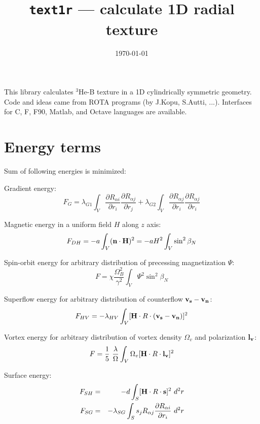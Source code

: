 \documentclass[a4paper]{article}
\begin{document}
\title{{\tt text1r} --- calculate 1D radial texture}
\date{\today}
\author{}
\maketitle

\def\sp{\sqrt{5}}
\def\st{\sqrt{3}}
\def\ddd#1#2{\frac{\partial #1}{\partial #2}}

This library calculates $^3$He-B texture in a 1D cylindrically
symmetric geometry. Code and ideas came from ROTA programs (by J.Kopu,
S.Autti, ...). Interfaces for C, F, F90, Matlab, and Octave languages
are available.

\section*{Energy terms}

Sum of following energies is minimized:

\def\bn{{\bf n}}
\def\bH{{\bf H}}
\def\divn{(\nabla\cdot\bn)}
\def\rotn{(\nabla\times\bn)}
\def\grn{\nabla\bn}

Gradient energy:
$$
F_{G}  = \lambda_{G1}\int_V
  \frac{\partial R_{\alpha i}}{\partial r_i}
  \frac{\partial R_{\alpha j}}{\partial r_j}
       + \lambda_{G2}\int_V
  \frac{\partial R_{\alpha j}}{\partial r_i}
  \frac{\partial R_{\alpha j}}{\partial r_i}
$$

Magnetic energy in a uniform field $H$ along $z$ axis:
$$
F_{DH} = - a \int_V (\bn\cdot\bH)^2 = -a H^2 \int_V \sin^2\beta_N
$$

Spin-orbit energy for arbitrary distribution of precessing magnetization $\Psi$:
$$
F = \chi \frac{\Omega^2_B}{\gamma^2} \int_V  \Psi^2 \sin^2\beta_N
$$

Superflow energy for arbitrary distribution of counterflow ${\bf v_s-v_n}$:
$$
F_{HV} = - \lambda_{HV} \int_V [\bH \cdot R \cdot ({\bf v_s-v_n})]^2
$$

Vortex energy for arbitrary distribution of vortex density $\Omega_v$
and polarization ${\bf l_v}$:
$$
F = \frac15\ \frac{\lambda}{\Omega} \int_V  \Omega_v [\bH \cdot R \cdot {\bf l_v}]^2
$$

Surface energy:
\begin{eqnarray*}
F_{SH} &=& -d
  \int_S [{\bf H} \cdot R \cdot {\bf s} ]^2\ d^2r\\
F_{SG} &=& -\lambda_{SG}
  \int_S s_j R_{\alpha j}
    \frac{\partial R_{\alpha i}}{\partial r_i}\ d^2r\\
\end{eqnarray*}
\end{document}
